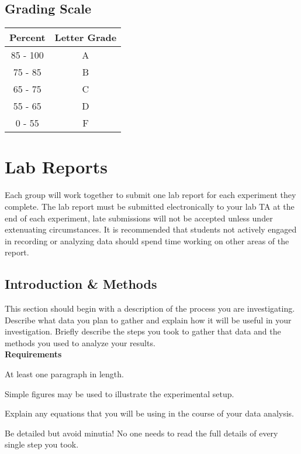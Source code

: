 \subsection*{Grading Scale}
\begin{table}[ht]
\centering
\begin{tabular}{|c|c|}
\hline 
\rule[-1ex]{0pt}{2.5ex} Percent & Letter Grade \\ 
\hline 
\rule[-1ex]{0pt}{2.5ex} 85 - 100 & A \\ 
\hline 
\rule[-1ex]{0pt}{2.5ex} 75 - 85 & B \\ 
\hline 
\rule[-1ex]{0pt}{2.5ex} 65 - 75 & C \\ 
\hline 
\rule[-1ex]{0pt}{2.5ex} 55 - 65 & D \\ 
\hline 
\rule[-1ex]{0pt}{2.5ex} 0 - 55 & F \\ 
\hline 
\end{tabular}
\end{table}

\newpage

\section*{Lab Reports}
Each group will work together to submit one lab report for each experiment they complete.
The lab report must be submitted electronically to your lab TA at the end of each experiment, late submissions will not be accepted unless under extenuating circumstances.
It is recommended that students not actively engaged in recording or analyzing data should spend time working on other areas of the report.

\subsection*{Introduction \& Methods}
This section should begin with a description of the process you are investigating.
Describe what data you plan to gather and explain how it will be useful in your investigation.
Briefly describe the steps you took to gather that data and the methods you used to analyze your results. \\
\textbf{Requirements}
\begin{list}{-}{\topsep=0pt \itemsep=0pt}
	\item At least one paragraph in length.
	\item Simple figures may be used to illustrate the experimental setup.
	\item Explain any equations that you will be using in the course of your data analysis.
	\item Be detailed but avoid minutia! No one needs to read the full details of every single step you took. 
\end{list}

